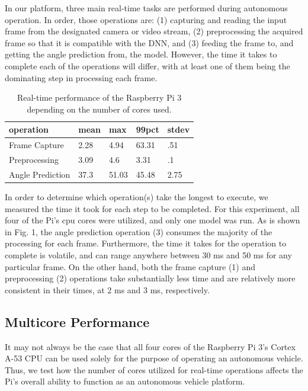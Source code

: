\documentclass[10pt, conference]{IEEEtran}
\begin{document}
In our platform, three main real-time tasks are performed during autonomous operation. 
In order, those operations are: (1) capturing and reading the input frame from the designated camera 
or video stream, (2) preprocessing the acquired frame so that it is compatible with the DNN, and (3) 
feeding the frame to, and getting the angle prediction from, the model. However, the time it takes to 
complete each of the operations will differ, with at least one of them being the dominating step in 
processing each frame.

\begin{table}[h]
  \centering
  \begin{tabular} {| l | l | l | l | l |}
    \hline
    \textbf{operation} & \textbf{mean} & \textbf{max} & \textbf{99pct} & \textbf{stdev} \\ \hline 
    Frame Capture & 2.28 & 4.94 & 63.31 &  .51\\ \hline
    Preprocessing & 3.09 & 4.6 & 3.31 & .1 \\ \hline
    Angle Prediction & 37.3 & 51.03 & 45.48 & 2.75 \\ 
    \hline
  \end{tabular}
  \caption{Real-time performance of the Raspberry Pi 3 depending on the number of cores used.}
\end{table}

In order to determine which operation(s) take the longest to execute, we measured the time it 
took for each step to be completed. For this experiment, all four of the Pi's cpu cores were utilized, 
and only one model was run. As is shown in Fig. 1, the angle prediction operation (3) consumes the 
majority of the processing for each frame. Furthermore, the time it takes for the operation to 
complete is volatile, and can range anywhere between 30 ms and 50 ms for any particular frame. On the 
other hand, both the frame capture (1) and preprocessing (2) operations take substantially less time 
and are relatively more consistent in their times, at 2 ms and 3 ms, respectively. 

\subsection{Multicore Performance}
It may not always be the case that all four cores of the Raspberry Pi 3's Cortex A-53 CPU can be used 
solely for the purpose of operating an autonomous vehicle. Thus, we test how the number of cores 
utilized for real-time operations affects the Pi's overall ability to function as an autonomous 
vehicle platform.
\end{document}
